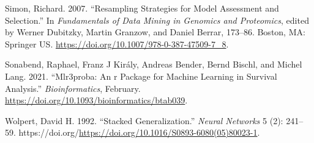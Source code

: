\documentclass[
]{scrbook}
\newlength{\cslhangindent}
\newlength{\cslentryspacingunit} %
\newenvironment{CSLReferences}[2] %
 {%
  \setlength{\parindent}{0pt}
  \ifodd #1
  \let\oldpar\par
  \def\par{\hangindent=\cslhangindent\oldpar}
  \fi
  \setlength{\parskip}{#2\cslentryspacingunit}
 }%
 {}
\begin{document}
\begin{CSLReferences}{1}{0}
\leavevmode{}%
Simon, Richard. 2007. {``Resampling Strategies for Model Assessment and Selection.''} In \emph{Fundamentals of Data Mining in Genomics and Proteomics}, edited by Werner Dubitzky, Martin Granzow, and Daniel Berrar, 173--86. {Boston, MA}: {Springer US}. \url{https://doi.org/10.1007/978-0-387-47509-7_8}.

\leavevmode{}%
Sonabend, Raphael, Franz J Király, Andreas Bender, Bernd Bischl, and Michel Lang. 2021. {``Mlr3proba: An r Package for Machine Learning in Survival Analysis.''} \emph{Bioinformatics}, February. \url{https://doi.org/10.1093/bioinformatics/btab039}.

\leavevmode{}%
Wolpert, David H. 1992. {``Stacked Generalization.''} \emph{Neural Networks} 5 (2): 241--59. https://doi.org/\url{https://doi.org/10.1016/S0893-6080(05)80023-1}.

\end{CSLReferences}
\end{document}
